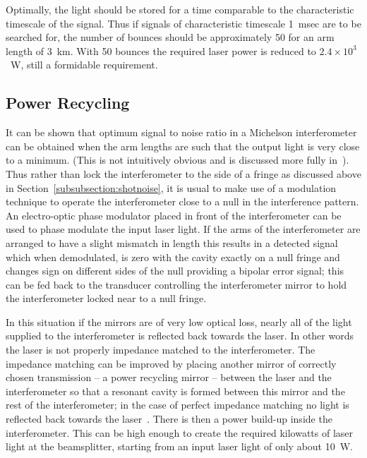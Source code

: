 \documentclass{article}
\begin{document}
Optimally, the light should be stored for a time comparable to the
characteristic timescale of the signal. Thus if signals of characteristic
timescale 1~msec are to be searched for, the number of bounces should be
approximately 50 for an arm length of 3~km. With 50 bounces the required laser
power is reduced to $2.4 \times 10^3$~W, still a formidable requirement.



\subsection{Power Recycling}
\label{subsection:powerrec}

It can be shown that optimum signal to noise ratio in a Michelson interferometer
can be obtained when the arm lengths are such that the output light is very
close to a minimum. (This is not intuitively obvious and is discussed more fully
in~\cite{Edelstein}). Thus rather than lock the interferometer to the side of a
fringe as discussed above in Section~\ref{subsubsection:shotnoise}, it is usual
to make use of a modulation technique to operate the interferometer close to a
null in the interference pattern. An electro-optic phase modulator placed in
front of the interferometer can be used to phase modulate the input laser light.
If the arms of the interferometer are arranged to have a slight mismatch in
length this results in a detected signal which when demodulated, is zero with
the cavity exactly on a null fringe and changes sign on different sides of the
null providing a bipolar error signal; this can be fed back to the transducer
controlling the interferometer mirror to hold the interferometer locked near to
a null fringe.

In this situation if the mirrors are of very low optical loss, nearly all of the
light supplied to the interferometer is reflected back towards the laser. In
other words the laser is not properly impedance matched to the interferometer.
The impedance matching can be improved by placing another mirror of correctly
chosen transmission -- a power recycling mirror -- between the laser and the
interferometer so that a resonant cavity is formed between this mirror and the
rest of the interferometer; in the case of perfect impedance matching no light
is reflected back towards the laser~\cite{Drever3, Schilling}. There is then a
power build-up inside the interferometer. This can be high enough to create the
required kilowatts of laser light at the beamsplitter, starting from an input
laser light of only about 10~W.
\end{document}
